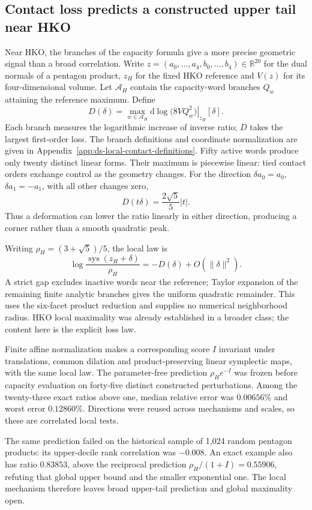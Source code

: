 \subsection{Contact loss predicts a constructed upper tail near HKO}
\label{subsec:ds-local-contact-loss}

Near HKO, the branches of the capacity formula give a more precise geometric
signal than a broad correlation. Write
$z=(a_0,\ldots,a_4,b_0,\ldots,b_4)\in\mathbb R^{20}$ for the dual normals
of a pentagon product, $z_H$ for the fixed HKO reference and $V(z)$ for its
four-dimensional volume. Let $\mathcal A_H$ contain the capacity-word branches
$Q_w$ attaining the reference maximum. Define
\[
 D(\delta)=\max_{w\in\mathcal A_H}
 \left.\mathrm d\log\bigl(8VQ_w^2\bigr)\right|_{z_H}[\delta].
\]
Each branch measures the logarithmic increase of inverse ratio; $D$ takes
the largest first-order loss. The branch definitions and coordinate
normalization are given in Appendix~\ref{app:ds-local-contact-definitions}.
Fifty active words produce only twenty distinct linear forms. Their maximum
is piecewise linear: tied contact orders exchange control as the geometry
changes. For the direction $\delta a_0=a_0$, $\delta a_1=-a_1$, with all
other changes zero,
\[
 D(t\delta)=\frac{2\sqrt5}{5}|t|.
\]
Thus a deformation can lower the ratio linearly in either direction,
producing a corner rather than a smooth quadratic peak.

Writing $\rho_H=(3+\sqrt5)/5$, the local law is
\[
 \log\frac{\operatorname{sys}(z_H+\delta)}{\rho_H}
 =-D(\delta)+O(\|\delta\|^2).
\]
A strict gap excludes inactive words near the reference; Taylor expansion
of the remaining finite analytic branches gives the uniform quadratic
remainder. This uses the six-facet product reduction and supplies no
numerical neighborhood radius. HKO local maximality was already established
in a broader class; the content here is the explicit loss law.

Finite affine normalization makes a corresponding score $I$ invariant
under translations, common dilation and product-preserving linear symplectic
maps, with the same local law. The parameter-free prediction
$\rho_H e^{-I}$ was frozen before capacity evaluation on forty-five distinct
constructed perturbations. Among the twenty-three exact ratios above one,
median relative error was $0.00656\%$ and worst error $0.12860\%$.
Directions were reused across mechanisms and scales, so these are correlated
local tests.

The same prediction failed on the historical sample of 1,024 random
pentagon products: its upper-decile rank correlation was $-0.008$.
An exact example also has ratio $0.83853$, above the reciprocal prediction
$\rho_H/(1+I)=0.55906$, refuting that global upper bound and the smaller
exponential one. The local mechanism therefore leaves broad upper-tail
prediction and global maximality open.
